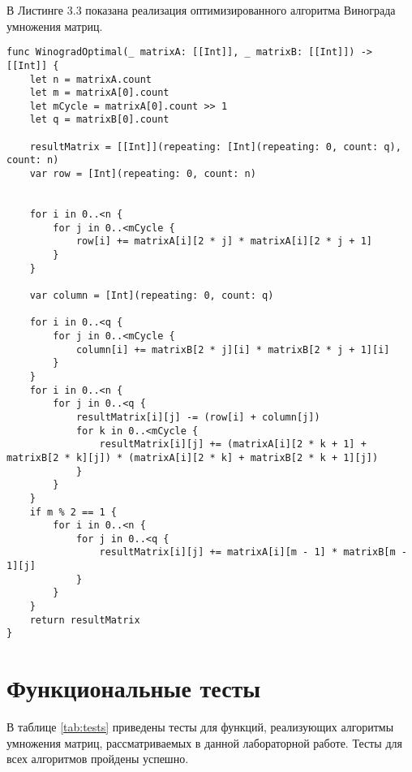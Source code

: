 В Листинге 3.3 показана реализация оптимизированного алгоритма Винограда умножения матриц.
\begin{lstlisting}[caption=Функция оптимизированного алгоритма Винограда умножения матриц]
func WinogradOptimal(_ matrixA: [[Int]], _ matrixB: [[Int]]) -> [[Int]] {
    let n = matrixA.count
    let m = matrixA[0].count
    let mCycle = matrixA[0].count >> 1
    let q = matrixB[0].count
    
    resultMatrix = [[Int]](repeating: [Int](repeating: 0, count: q), count: n)
    var row = [Int](repeating: 0, count: n)
    
    
    for i in 0..<n {
        for j in 0..<mCycle {
            row[i] += matrixA[i][2 * j] * matrixA[i][2 * j + 1]
        }
    }
    
    var column = [Int](repeating: 0, count: q)
    
    for i in 0..<q {
        for j in 0..<mCycle {
            column[i] += matrixB[2 * j][i] * matrixB[2 * j + 1][i]
        }
    }
    for i in 0..<n {
        for j in 0..<q {
            resultMatrix[i][j] -= (row[i] + column[j])
            for k in 0..<mCycle {
                resultMatrix[i][j] += (matrixA[i][2 * k + 1] + matrixB[2 * k][j]) * (matrixA[i][2 * k] + matrixB[2 * k + 1][j])
            }
        }
    }
    if m % 2 == 1 {
        for i in 0..<n {
            for j in 0..<q {
                resultMatrix[i][j] += matrixA[i][m - 1] * matrixB[m - 1][j]
            }
        }
    }
    return resultMatrix
}
\end{lstlisting}


\section{Функциональные тесты}

В таблице \ref{tab:tests} приведены тесты для функций, реализующих алгоритмы умножения матриц, рассматриваемых в данной лабораторной работе. Тесты для всех алгоритмов пройдены успешно.


